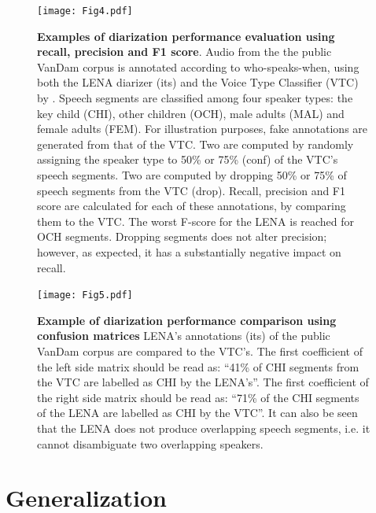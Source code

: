 \documentclass[smallextended]{svjour3}       %
\begin{document}
\begin{figure}[htb]

\centering
\texttt{[image: Fig4.pdf]}

\caption{\label{fig:precision}\textbf{Examples of diarization performance evaluation using recall, precision and F1 score}. Audio from the the public VanDam corpus \citep{vandam-day} is annotated according to who-speaks-when, using both the LENA diarizer (its) and the Voice Type Classifier (VTC) by \citet{lavechin2020opensource}. Speech segments are classified among four speaker types: the key child (CHI), other children (OCH), male adults (MAL) and female adults (FEM). For illustration purposes, fake annotations are generated from that of the VTC. Two are computed by randomly assigning the speaker type to 50\% or 75\% (conf) of the VTC's speech segments. Two are computed by dropping 50\% or 75\% of speech segments from the VTC (drop). Recall, precision and F1 score are calculated for each of these annotations, by comparing them to the VTC. The worst F-score for the LENA is reached for OCH segments. Dropping segments does not alter precision; however, as expected, it has a substantially negative impact on recall.
}

\end{figure}


\begin{figure}[htb]

\centering
\texttt{[image: Fig5.pdf]}

\caption{\label{fig:confusion}\textbf{Example of diarization performance comparison using confusion matrices}
LENA's annotations (its) of the public VanDam corpus \citep{vandam-day} are compared to the VTC's. The first coefficient of the left side matrix should be read as: ``41\% of CHI segments from the VTC are labelled as CHI by the LENA's''. The first coefficient of the right side matrix should be read as: ``71\% of the CHI segments of the LENA are labelled as CHI by the VTC''. It can also be seen that the LENA does not produce overlapping speech segments, i.e. it cannot disambiguate two overlapping speakers.
}

\end{figure}


\section{Generalization}
\end{document}
